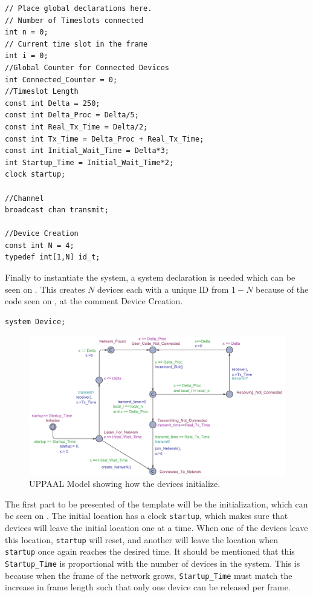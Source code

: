 \begin{lstlisting}[style=UPPAAL,
caption={Code for the global declarations.}, label={uppaal_Global}, multicols=2]
// Place global declarations here.
// Number of Timeslots connected
int n = 0;         
// Current time slot in the frame
int i = 0;            
//Global Counter for Connected Devices                    
int Connected_Counter = 0;
//Timeslot Length
const int Delta = 250;                 
const int Delta_Proc = Delta/5;
const int Real_Tx_Time = Delta/2;
const int Tx_Time = Delta_Proc + Real_Tx_Time;
const int Initial_Wait_Time = Delta*3;
int Startup_Time = Initial_Wait_Time*2;
clock startup;

//Channel
broadcast chan transmit;

//Device Creation
const int N = 4;
typedef int[1,N] id_t;
\end{lstlisting}

Finally to instantiate the system, a system declaration is needed which can be seen on .
This creates $N$ devices each with a unique ID from $1 - N$ because of the code seen on , at the comment Device Creation.

\begin{lstlisting}[style=UPPAAL,
caption={Code for system declarations.}, label={UPPAAL_System_Dcl}]
system Device;
\end{lstlisting}

\begin{figure}
  \includegraphics[width=1\textwidth]{Figures/Model/Device_Connecting.pdf} 
\caption{UPPAAL Model showing how the devices initialize.}
\label{fig:UPPAAL_Intitialization}
\end{figure}

\bigskip \noindent
The first part to be presented of the template will be the initialization, which can be seen on .
The initial location has a clock \texttt{startup}, which makes sure that devices will leave the initial location one at a time.
When one of the devices leave this location, \texttt{startup} will reset, and another will leave the location when \texttt{startup} once again reaches the desired time.
It should be mentioned that this \texttt{Startup\_Time} is proportional with the number of devices in the system.
This is because when the frame of the network grows, \texttt{Startup\_Time} must match the increase in frame length such that only one device can be released per frame.

